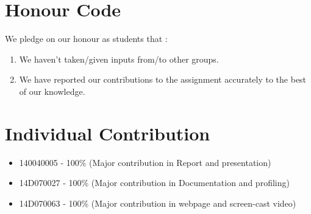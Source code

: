 \documentclass{report}
\begin{document}
\section{Honour Code}
We pledge on our honour as students that : 
\begin{enumerate}
\item We haven't taken/given inputs from/to other groups.
\item We have reported our contributions to the assignment accurately to the best of our knowledge.
\end{enumerate}

\section{Individual Contribution}
\begin{itemize}
\item 140040005 - 100\% (Major contribution in Report and presentation)
\item 14D070027 - 100\% (Major contribution in Documentation and profiling)
\item 14D070063 - 100\% (Major contribution in webpage and screen-cast video)
\end{itemize}

\printbibliography
\end{document}
